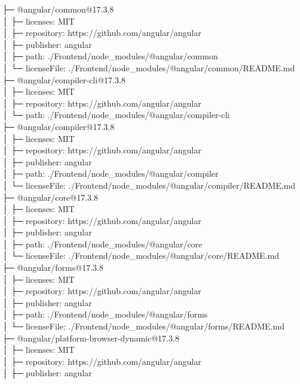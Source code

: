 ├─ @angular/common@17.3.8\\
│  ├─ licenses: MIT\\
│  ├─ repository: https://github.com/angular/angular\\
│  ├─ publisher: angular\\
│  ├─ path: ./Frontend/node\_modules/@angular/common\\
│  └─ licenseFile: ./Frontend/node\_modules/@angular/common/README.md\\
├─ @angular/compiler-cli@17.3.8\\
│  ├─ licenses: MIT\\
│  ├─ repository: https://github.com/angular/angular\\
│  └─ path: ./Frontend/node\_modules/@angular/compiler-cli\\
├─ @angular/compiler@17.3.8\\
│  ├─ licenses: MIT\\
│  ├─ repository: https://github.com/angular/angular\\
│  ├─ publisher: angular\\
│  ├─ path: ./Frontend/node\_modules/@angular/compiler\\
│  └─ licenseFile: ./Frontend/node\_modules/@angular/compiler/README.md\\
├─ @angular/core@17.3.8\\
│  ├─ licenses: MIT\\
│  ├─ repository: https://github.com/angular/angular\\
│  ├─ publisher: angular\\
│  ├─ path: ./Frontend/node\_modules/@angular/core\\
│  └─ licenseFile: ./Frontend/node\_modules/@angular/core/README.md\\
├─ @angular/forms@17.3.8\\
│  ├─ licenses: MIT\\
│  ├─ repository: https://github.com/angular/angular\\
│  ├─ publisher: angular\\
│  ├─ path: ./Frontend/node\_modules/@angular/forms\\
│  └─ licenseFile: ./Frontend/node\_modules/@angular/forms/README.md\\
├─ @angular/platform-browser-dynamic@17.3.8\\
│  ├─ licenses: MIT\\
│  ├─ repository: https://github.com/angular/angular\\
│  ├─ publisher: angular\\
